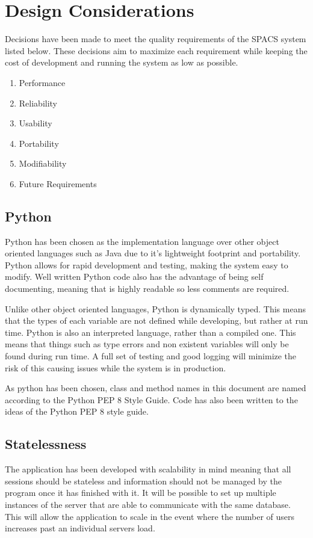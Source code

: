 \section{Design Considerations}

\par
Decisions have been made to meet the quality requirements of the SPACS system listed below. These decisions aim to maximize each requirement while keeping the cost of development and running the system as low as possible.

\begin{enumerate}
	\item Performance
	\item Reliability
	\item Usability
	\item Portability
	\item Modifiability
	\item Future Requirements
\end{enumerate}

\subsection{Python}
\par
Python has been chosen as the implementation language over other object oriented languages such as Java due to it's lightweight footprint and portability. Python allows for rapid development and testing, making the system easy to modify. Well written Python code also has the advantage of being self documenting, meaning that is highly readable so less comments are required.

\par
Unlike other object oriented languages, Python is dynamically typed. This means that the types of each variable are not defined while developing, but rather at run time. Python is also an interpreted language, rather than a compiled one. This means that things such as type errors and non existent variables will only be found during run time. A full set of testing and good logging will minimize the risk of this causing issues while the system is in production.

\par
As python has been chosen, class and method names in this document are named according to the Python PEP 8 Style Guide. Code has also been written to the ideas of the Python PEP 8 style guide.

\subsection{Statelessness}
\par
The application has been developed with scalability in mind meaning that all sessions should be stateless and information should not be managed by the program once it has finished with it. It will be possible to set up multiple instances of the server that are able to communicate with the same database. This will allow the application to scale in the event where the number of users increases past an individual servers load.

